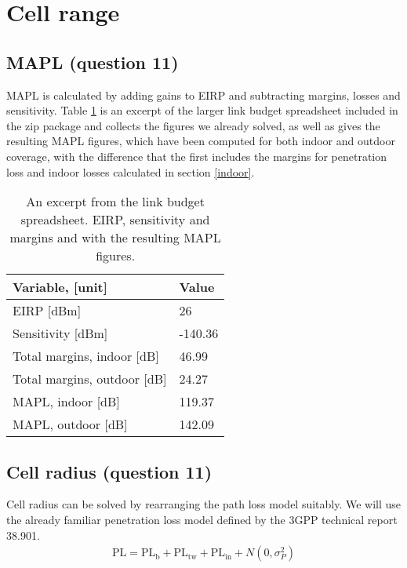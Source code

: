 \documentclass{article}
\begin{document}
\section{Cell range}
\label{cell_r}

\subsection{MAPL (question 11)}
MAPL is calculated by adding gains to EIRP and subtracting margins, losses and sensitivity. Table \ref{tab:mapl} is an excerpt of the larger link budget spreadsheet included in the zip package and collects the figures we already solved, as well as gives the resulting MAPL figures, which have been computed for both indoor and outdoor coverage, with the difference that the first includes the margins for penetration loss and indoor losses calculated in section \ref{indoor}.

\begin{table}[!htb]
    \centering
    \begin{tabular}{|l|l|}                                          \hline
    \textbf{Variable, [unit]}                 & \textbf{Value}   \\ \hline
    EIRP {[}dBm{]}                            & 26               \\ \hline
    Sensitivity {[}dBm{]}                     & -140.36          \\ \hline
    Total margins, indoor {[}dB{]}            & 46.99            \\ \hline
    Total margins, outdoor {[}dB{]}           & 24.27            \\ \hline
    MAPL, indoor {[}dB{]}                     & 119.37           \\ \hline
    MAPL, outdoor {[}dB{]}                    & 142.09           \\ \hline
    \end{tabular}
    \caption{An excerpt from the link budget spreadsheet. EIRP, sensitivity and margins and with the resulting MAPL figures.}
    \label{tab:mapl}
\end{table}

\subsection{Cell radius (question 11)}
Cell radius can be solved by rearranging the path loss model suitably. We will use the already familiar penetration loss model defined by the 3GPP technical report 38.901.
\begin{align*}
    \mathrm{PL} = \mathrm{PL_b} + \mathrm{PL_{tw}} + \mathrm{PL_{in}} + N(0, \sigma^2_P)
\end{align*}
\end{document}
